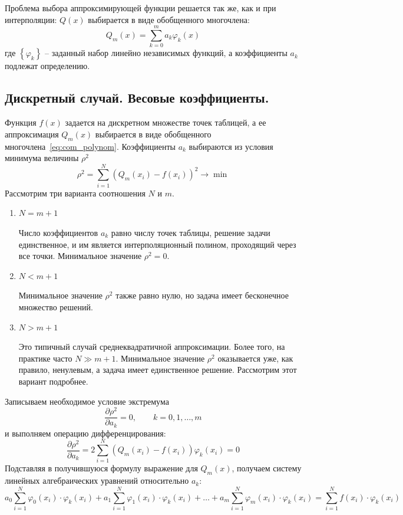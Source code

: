 \documentclass[../../calc-math-exam-2023.tex]{subfiles}
\begin{document}
    Проблема выбора аппроксимирующей функции решается так же, как и при интерполяции:
    $Q(x)$ выбирается в виде обобщенного многочлена:
    \begin{equation}
        Q_m(x) = \sum_{k=0}^{m} a_k \varphi_k (x) \label{eq:com_polynom}
    \end{equation}
    где $\left\{ \varphi_k \right\}$ -- заданный набор линейно независимых функций,
    а коэффициенты $a_k$ подлежат определению.

    \subsection{Дискретный случай. Весовые коэффициенты.}
    Функция $f(x)$ задается на дискретном множестве точек таблицей, а ее
    аппроксимация $Q_m(x)$ выбирается в виде обобщенного многочлена~\eqref{eq:com_polynom}.
    Коэффициенты $a_k$ выбираются из условия минимума величины $\rho^2$
    \begin{equation}
        \rho^2 = \sum_{i=1}^{N} \left( Q_m(x_i) - f(x_i) \right)^2 \rightarrow \min \label{eq:approx_criteria}
    \end{equation}
    Рассмотрим три варианта соотношения $N$ и $m$.
    \begin{enumerate}
        \item $N = m + 1$

        Число коэффициентов $a_k$ равно числу точек таблицы, решение задачи
        единственное, и им является интерполяционный полином, проходящий
        через все точки. Минимальное значение $\rho^2 = 0$.
        \item $N < m + 1$

        Минимальное значение $\rho^2$ также равно нулю, но задача имеет
        бесконечное множество решений.
        \item $N > m + 1$

        Это типичный случай среднеквадратичной аппроксимации. Более того,
        на практике часто $N \gg m + 1$. Минимальное значение $\rho^2$
        оказывается уже, как правило, ненулевым, а задача имеет единственное
        решение. Рассмотрим этот вариант подробнее.
    \end{enumerate}
    Записываем необходимое условие экстремума
    \begin{equation*}
        \frac{\partial \rho^2}{\partial a_k} = 0, \qquad k=0,1,\dots,m
    \end{equation*}
    и выполняем операцию дифференцирования:
    \begin{equation*}
        \frac{\partial \rho^2}{\partial a_k} = 2 \sum_{i=1}^{N} \left( Q_m(x_i) - f(x_i) \right)\varphi_k(x_i) = 0
    \end{equation*}
    Подставляя в получившуюся формулу выражение для $Q_m(x)$, получаем систему
    линейных алгебраических уравнений относительно $a_k$:
    \begin{equation}
        \label{eq:approx_eqsys}
        a_0 \sum_{i=1}^{N} \varphi_0(x_i)\cdot \varphi_k(x_i) + a_1 \sum_{i=1}^{N} \varphi_1(x_i)\cdot \varphi_k(x_i) + \dots + a_m \sum_{i=1}^{N} \varphi_m(x_i) \cdot \varphi_k(x_i) = \sum_{i=1}^{N} f(x_i) \cdot \varphi_k(x_i)
    \end{equation}
\end{document}

